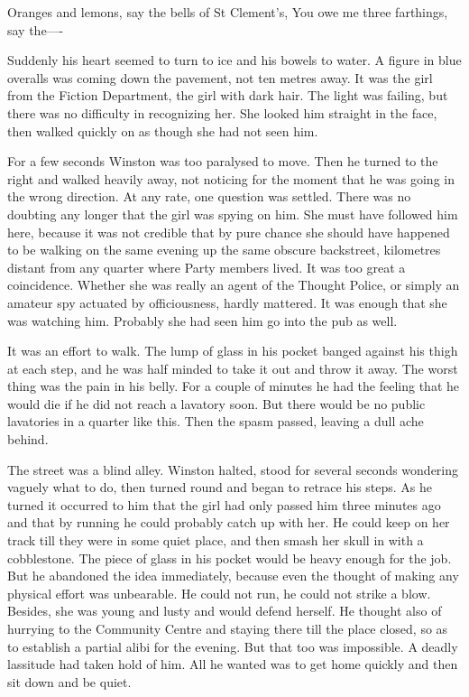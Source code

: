 \documentclass{article}
\begin{document}
  Oranges and lemons, say the bells of St Clement's,
  You owe me three farthings, say the----


Suddenly his heart seemed to turn to ice and his bowels to water. A figure
in blue overalls was coming down the pavement, not ten metres away. It was
the girl from the Fiction Department, the girl with dark hair. The light
was failing, but there was no difficulty in recognizing her. She looked
him straight in the face, then walked quickly on as though she had not
seen him.

For a few seconds Winston was too paralysed to move. Then he turned to the
right and walked heavily away, not noticing for the moment that he was
going in the wrong direction. At any rate, one question was settled. There
was no doubting any longer that the girl was spying on him. She must have
followed him here, because it was not credible that by pure chance she
should have happened to be walking on the same evening up the same obscure
backstreet, kilometres distant from any quarter where Party members lived.
It was too great a coincidence. Whether she was really an agent of the
Thought Police, or simply an amateur spy actuated by officiousness, hardly
mattered. It was enough that she was watching him. Probably she had seen
him go into the pub as well.

It was an effort to walk. The lump of glass in his pocket banged against
his thigh at each step, and he was half minded to take it out and throw it
away. The worst thing was the pain in his belly. For a couple of minutes
he had the feeling that he would die if he did not reach a lavatory soon.
But there would be no public lavatories in a quarter like this. Then the
spasm passed, leaving a dull ache behind.

The street was a blind alley. Winston halted, stood for several seconds
wondering vaguely what to do, then turned round and began to retrace his
steps. As he turned it occurred to him that the girl had only passed him
three minutes ago and that by running he could probably catch up with her.
He could keep on her track till they were in some quiet place, and then
smash her skull in with a cobblestone. The piece of glass in his pocket
would be heavy enough for the job. But he abandoned the idea immediately,
because even the thought of making any physical effort was unbearable. He
could not run, he could not strike a blow. Besides, she was young and lusty
and would defend herself. He thought also of hurrying to the Community
Centre and staying there till the place closed, so as to establish a
partial alibi for the evening. But that too was impossible. A deadly
lassitude had taken hold of him. All he wanted was to get home quickly and
then sit down and be quiet.
\end{document}

